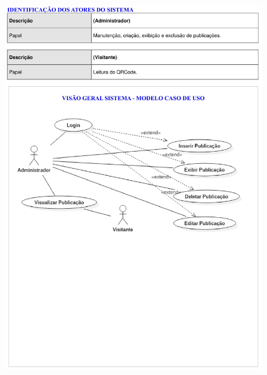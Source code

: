 \begin{figure}
    \includegraphics[width=\textwidth]{documentacao/ModeloArtefatos-05.jpg}
\end{figure}

